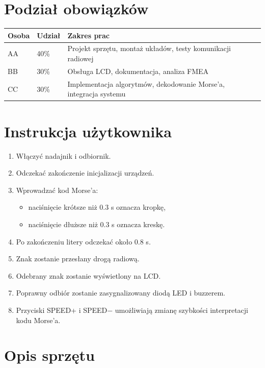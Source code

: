 \documentclass[a4paper,12pt]{article}
\begin{document}
\section{Podział obowiązków}

\begin{table}[h]
\centering
\begin{tabular}{|p{4cm}|p{2cm}|p{7cm}|}
\hline
Osoba & Udział & Zakres prac \\
\hline
AA & 40\% &
Projekt sprzętu, montaż układów, testy komunikacji radiowej \\
\hline
BB & 30\% &
Obsługa LCD, dokumentacja, analiza FMEA \\
\hline
CC & 30\% &
Implementacja algorytmów, dekodowanie Morse'a, integracja systemu \\
\hline
\end{tabular}
\end{table}

\section{Instrukcja użytkownika}

\begin{enumerate}
\item Włączyć nadajnik i odbiornik.
\item Odczekać zakończenie inicjalizacji urządzeń.
\item Wprowadzać kod Morse'a:
\begin{itemize}
\item naciśnięcie krótsze niż 0.3 s oznacza kropkę,
\item naciśnięcie dłuższe niż 0.3 s oznacza kreskę.
\end{itemize}
\item Po zakończeniu litery odczekać około 0.8 s.
\item Znak zostanie przesłany drogą radiową.
\item Odebrany znak zostanie wyświetlony na LCD.
\item Poprawny odbiór zostanie zasygnalizowany diodą LED i buzzerem.
\item Przyciski SPEED+ i SPEED− umożliwiają zmianę szybkości interpretacji kodu Morse'a.
\end{enumerate}

\section{Opis sprzętu}
\end{document}
